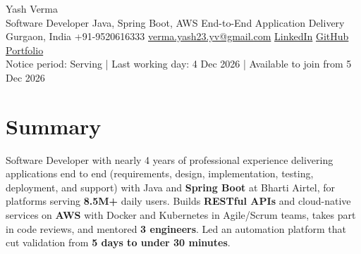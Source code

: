 \documentclass[letterpaper,10pt]{article}
\begin{document}
\begin{center}
  {\Huge Yash Verma} \\
  \small Software Developer \textbar{} Java, Spring Boot, AWS \textbar{} End-to-End Application Delivery \\
  \small Gurgaon, India \textbar{} +91-9520616333 \textbar{} \href{mailto:verma.yash23.yv@gmail.com}{verma.yash23.yv@gmail.com} \textbar{}
  \href{https://www.linkedin.com/in/yash-verma-9243a7193/}{LinkedIn} \textbar{}
  \href{https://github.com/yashverma230600}{GitHub} \textbar{}
  \href{https://yashverma230600.github.io/yashV-portfolio/}{Portfolio} \\
  Notice period: Serving | Last working day: 4 Dec 2026 | Available to join from 5 Dec 2026
  \vspace{-8pt}
\end{center}

\section{Summary}
\begin{itemize}[leftmargin=0.15in, label={}]
  \small{\item{
    Software Developer with nearly 4 years of professional experience delivering applications end to end (requirements, design, implementation, testing, deployment, and support) with Java and \textbf{Spring Boot} at Bharti Airtel, for platforms serving \textbf{8.5M+} daily users. Builds \textbf{RESTful APIs} and cloud-native services on \textbf{AWS} with Docker and Kubernetes in Agile/Scrum teams, takes part in code reviews, and mentored \textbf{3 engineers}. Led an automation platform that cut validation from \textbf{5 days to under 30 minutes}.
  }}
\end{itemize}
\vspace{-8pt}

\end{document}
